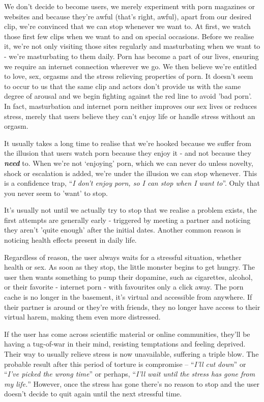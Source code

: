 \documentclass[
]{book}
\begin{document}
We don't decide to become users, we merely experiment with porn magazines or websites and because they're awful (that's right, awful), apart from our desired clip, we're convinced that we can stop whenever we want to. At first, we watch those first few clips when we want to and on special occasions. Before we realise it, we're not only visiting those sites regularly and masturbating when we want to - we're masturbating to them daily. Porn has become a part of our lives, ensuring we require an internet connection wherever we go. We then believe we're entitled to love, sex, orgasms and the stress relieving properties of porn. It doesn't seem to occur to us that the same clip and actors don't provide us with the same degree of arousal and we begin fighting against the red line to avoid 'bad porn'. In fact, masturbation and internet porn neither improves our sex lives or reduces stress, merely that users believe they can't enjoy life or handle stress without an orgasm.

It usually takes a long time to realise that we're hooked because we suffer from the illusion that users watch porn because they enjoy it - and not because they \textbf{\emph{need}} to. When we're not `enjoying' porn, which we can never do unless novelty, shock or escalation is added, we're under the illusion we can stop whenever. This is a confidence trap, ``\emph{I don't enjoy porn, so I can stop when I want to}''. Only that you never seem to 'want' to stop.

It's usually not until we actually try to stop that we realise a problem exists, the first attempts are generally early - triggered by meeting a partner and noticing they aren't 'quite enough' after the initial dates. Another common reason is noticing health effects present in daily life.

Regardless of reason, the user always waits for a stressful situation, whether health or sex. As soon as they stop, the little monster begins to get hungry. The user then wants something to pump their dopamine, such as cigarettes, alcohol, or their favorite - internet porn - with favourites only a click away. The porn cache is no longer in the basement, it's virtual and accessible from anywhere. If their partner is around or they're with friends, they no longer have access to their virtual harem, making them even more distressed.

If the user has come across scientific material or online communities, they'll be having a tug-of-war in their mind, resisting temptations and feeling deprived. Their way to usually relieve stress is now unavailable, suffering a triple blow. The probable result after this period of torture is compromise -- ``\emph{I'll cut down}'' or ``\emph{I've picked the wrong time}'' or perhaps, ``\emph{I'll wait until the stress has gone from my life.}'' However, once the stress has gone there's no reason to stop and the user doesn't decide to quit again until the next stressful time.
\end{document}
